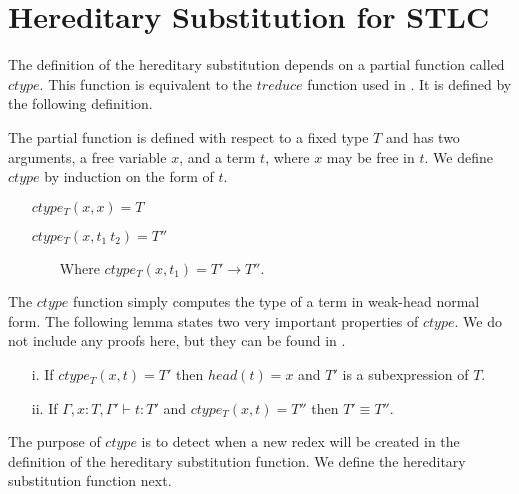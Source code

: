 \section{Hereditary Substitution for STLC}
\label{sec:hereditary_substitution_for_stlc}
The definition of the hereditary substitution depends on a partial
function called $ctype$.  This function is equivalent to the $treduce$
function used in \cite{Watkins:2004}. It is defined by the following
definition.
\begin{definition}
  \label{def:ctype_stlc}
  The partial function is defined with respect to a fixed type $T$
  and has two arguments, a free variable $x$, and a term $t$, where $x$
  may be free in $t$.  We define $ctype$ by induction on the form of $t$.
  \begin{itemize}
  \item[] $ctype_T(x,x) = T$
  \item[] $ctype_T(x,t_1\ t_2) = T''$
  \item[] \ \ \ \ Where $ctype_T(x,t_1) = T' \to T''$.
  \end{itemize}
\end{definition}
\noindent
The $ctype$ function simply computes the type of a term in weak-head normal form.
The following lemma states two very important properties of $ctype$.  We
do not include any proofs here, but they can be found in \cite{Eades:2011}.
\begin{lemmaItem}
  \label{lemma:ctype_props_stlc}
  \begin{itemize}
  \item[i.] If $ctype_T(x,t) = T'$ then $head(t) = x$ and $T'$ 
    is a subexpression of $T$.
    
  \item[ii.] If $\Gamma,x:T,\Gamma' \vdash t:T'$ and $ctype_T(x,t) = T''$ then
    $T' \equiv T''$.   
  \end{itemize}
\end{lemmaItem}
\noindent
The purpose of $ctype$ is to detect when a new redex will be created in the
definition of the hereditary substitution function. We define the
hereditary substitution function next.
